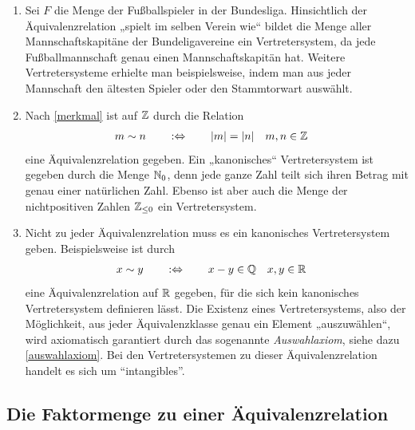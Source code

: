 \begin{bsp}[*] \quad
    \begin{enumerate}
        \item Sei $F$ die Menge der Fußballspieler in der Bundesliga. Hinsichtlich der Äquivalenzrelation „spielt im selben Verein wie“ bildet die Menge aller Mannschaftskapitäne der Bundeligavereine ein Vertretersystem, da jede Fußballmannschaft genau einen Mannschaftskapitän hat. Weitere Vertretersysteme erhielte man beispielsweise, indem man aus jeder Mannschaft den ältesten Spieler oder den Stammtorwart auswählt.
        \item Nach \cref{merkmal} ist auf $\mathbb Z$ durch die Relation
        \begin{align*}
            m\sim n\qquad&:\Leftrightarrow\qquad \vert m\vert=\vert n\vert && m,n\in \mathbb Z
        \end{align*}
        eine Äquivalenzrelation gegeben. Ein „kanonisches“ Vertretersystem ist gegeben durch die Menge $\mathbb N_0$, denn jede ganze Zahl teilt sich ihren Betrag mit genau einer natürlichen Zahl. Ebenso ist aber auch die Menge der nichtpositiven Zahlen $\mathbb Z_{\le 0}$ ein Vertretersystem.
        \item Nicht zu jeder Äquivalenzrelation muss es ein kanonisches Vertretersystem geben. Beispielsweise ist durch
        \begin{align*}
            x\sim y \qquad&:\Leftrightarrow\qquad x-y\in \mathbb Q && x,y\in \mathbb R
        \end{align*}
        eine Äquivalenzrelation auf $\mathbb R$ gegeben, für die sich kein kanonisches Vertretersystem definieren lässt. Die Existenz eines Vertretersystems, also der Möglichkeit, aus jeder Äquivalenzklasse genau ein Element „auszuwählen“, wird axiomatisch garantiert durch das sogenannte \emph{Auswahlaxiom}, siehe dazu \cref{auswahlaxiom}. Bei den Vertretersystemen zu dieser Äquivalenzrelation handelt es sich um ``intangibles''.
    \end{enumerate}
\end{bsp}





\subsection*{Die Faktormenge zu einer Äquivalenzrelation}


